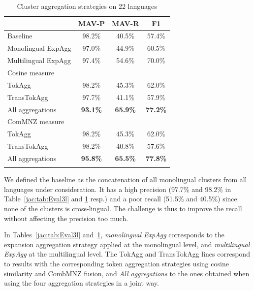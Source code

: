 \documentclass[output=paper]{langsci/langscibook}
\begin{document}
\begin{table}[h]
\begin{tabular}{lccc}\lsptoprule
&  \textnormal{MAV-P}  & \textnormal{MAV-R}  &  \textnormal{F1} \\ 
\midrule
Baseline                &     98.2\%   &  40.5\%  & 57.4\%  \\ 
Monolingual ExpAgg   &  97.0\%   &  44.9\%  & 60.5\%  \\ 
Multilingual ExpAgg &     97.4\%   &  54.6\%  & 70.0\%  \\ 
\midrule
\textnormal{Cosine measure}                 &    &   &   \\ 
TokAgg          &     98.2\%   &  45.3\%  & 62.0\%  \\  
TransTokAgg  &     97.7\%   &  41.1\%  & 57.9\%  \\
All aggregations &     \textbf{93.1\%}   &  \textbf{65.9\%}  & 
\textbf{77.2\%}  \\
\midrule
\textnormal{ComMNZ measure}                         &    &   &   \\ 
TokAgg          &     98.2\%   &  45.3\%  & 62.0\%  \\ 
TransTokAgg  &     98.2\%   &  40.8\%  & 57.6\%  \\  
All aggregations &     \textbf{95.8\%}   &  \textbf{65.5\%}  & 
\textbf{77.8\%}  \\
\lspbottomrule
\end{tabular}
\caption{Cluster aggregation strategies on 22 languages}
\label{jac:tab:Eval22l}
\end{table}

We defined the baseline as the concatenation of all monolingual
clusters from all languages under consideration. It has a high
precision (97.7\% and 98.2\% in Table~\ref{jac:tab:Eval3l} and
\ref{jac:tab:Eval22l} resp.) and a poor recall (51.5\% and 40.5\%) since
none of the clusters is cross-lingual. The challenge is thus to
improve the recall without affecting the precision too much.

In Tables~\ref{jac:tab:Eval3l} and~\ref{jac:tab:Eval22l}, \textit{monolingual
  ExpAgg} corresponds to the expansion aggregation strategy applied at
the monolingual level, and \textit{multilingual ExpAgg} at the
multilingual level.  The TokAgg and TransTokAgg lines correspond
to results with the corresponding token aggregation strategies using
cosine similarity and CombMNZ fusion, and \textit{All aggregations} to
the ones obtained when using the four aggregation strategies in a
joint way.
\end{document}
